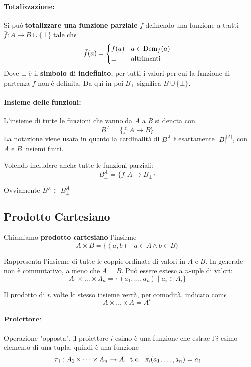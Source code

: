 \paragraph{Totalizzazione:} Si può \textbf{totalizzare una funzione parziale} $f$ definendo una funzione a tratti $\bar{f}: A \rightarrow B \cup \{\bot\}$ tale che
$$ 
\bar{f} (a) = \begin{cases}
	f(a) & a \in \text{Dom}_f(a) \\
	\bot & \text{altrimenti}
\end{cases}
$$
Dove $\bot$ è il \textbf{simbolo di indefinito}, per tutti i valori per cui la funzione di partenza $f$ non è definita. Da qui in poi $B_\bot$ significa $B \cup \{\bot\}$.

\paragraph{Insieme delle funzioni:} L'insieme di tutte le funzioni che vanno da $A$ a $B$ si denota con
$$ B^A = \{f: A \rightarrow B \} $$
La notazione viene usata in quanto la cardinalità di $B^A$ è esattamente $|B|^{|A|}$, con $A$ e $B$ insiemi finiti.

Volendo includere anche tutte le funzioni parziali: 
$$ B^A_\bot = \{f: A \rightarrow B_\bot \} $$

Ovviamente $B^{A} \subset B^{A}_{\bot}$

\subsection{Prodotto Cartesiano}

Chiamiamo \textbf{prodotto cartesiano} l'insieme
$$ A \times B = \{(a,b) \mid a \in A \wedge b \in B \} $$

Rappresenta l'insieme di tutte le coppie ordinate di valori in $A$ e $B$. In generale non è commutativo, a meno che $A = B$. Può essere esteso a $n$-uple di valori:
$$ A_1 \times \dots \times A_n = \{(a_1, \dots, a_n) \mid a_i \in A_i\} $$

Il prodotto di $n$ volte lo stesso insieme verrà, per comodità, indicato come
$$ A \times \dots \times A = A^n $$

\paragraph{Proiettore:} Operazione "opposta", il proiettore $i$-esimo è una funzione che estrae l'$i$-esimo elemento di una tupla, quindi è una funzione
$$ \pi_i: A_1 \times \dots \times A_n \rightarrow A_i \; \text{ t.c. } \; \pi_i (a_1, \dots, a_n) = a_i $$

